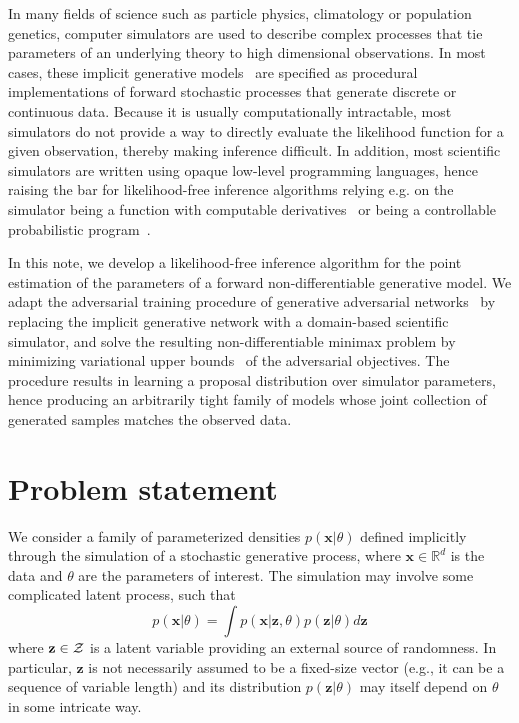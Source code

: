 \documentclass[twocolumn,superscriptaddress,aps]{revtex4-1}
\theoremstyle{plain}
\begin{document}
In many fields of science such as particle physics, climatology or population
genetics, computer simulators are used to describe complex processes that tie
parameters of an underlying theory to high dimensional observations. In most
cases, these implicit generative models~\citep{2016arXiv161003483M} are
specified as procedural implementations of forward stochastic processes that
generate discrete or continuous data. Because it is usually computationally intractable, most simulators
do not provide a way to directly evaluate the likelihood function for a
given observation, thereby making inference difficult.
In addition, most scientific simulators are written using opaque low-level programming
languages, hence raising the bar for likelihood-free inference
algorithms relying e.g. on the simulator being a function with computable derivatives~\citep{2016arXiv160507826G}
or being a controllable probabilistic program~\citep{2016arXiv161009900L}.

In this note, we develop a likelihood-free inference algorithm for the point
estimation of the parameters of a forward non-differentiable
generative model. We adapt the adversarial
training procedure of generative adversarial
networks~\cite{goodfellow2014generative} by replacing the implicit generative
network with a domain-based scientific simulator, and solve the resulting
non-differentiable minimax problem by minimizing variational upper
bounds~\citep{2011arXiv1106.4487W,2012arXiv1212.4507S} of the adversarial
objectives. The procedure results in learning a proposal distribution over
simulator parameters, hence producing an arbitrarily tight family of models whose
joint collection of generated samples matches the observed data.



\section{Problem statement}
\label{sec:problem}

We consider a family of parameterized densities $p(\mathbf{x}|\theta)$
defined implicitly through the simulation of a stochastic generative process,
where $\mathbf{x} \in \mathbb{R}^d$ is the data and $\theta$ are the
parameters of interest. The simulation may involve some complicated latent
process, such that
\begin{equation}\label{eqn:p_x}
    p(\mathbf{x}|\theta) = \int p(\mathbf{x}|\mathbf{z},\theta) p(\mathbf{z}|\theta) d\mathbf{z}
\end{equation}
where $\mathbf{z} \in {\cal Z}$ is a latent variable providing an external
source of randomness. In particular, $\mathbf{z}$ is not necessarily assumed to
be a fixed-size vector (e.g., it can be a sequence of variable length) and its
distribution $p(\mathbf{z}|\theta)$ may itself depend on $\theta$ in some intricate way.
\end{document}
